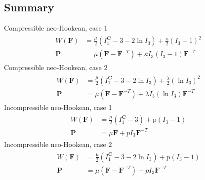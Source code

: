 \documentclass[12pt,3p]{article}
\numberwithin{equation}{section}
\begin{document}
\subsection{Summary}
Compressible neo-Hookean, case 1
\begin{align}
\begin{split}
W(\mathbf{F}) &= \frac{\mu}{2} (I_1^{\mathbf{C}} - 3 - 2 \ln I_3) + \frac{\kappa}{2} (I_3 - 1)^2 \\
\mathbf{P} &= \mu ( \mathbf{F} - \mathbf{F}^{-T}) + \kappa I_3 (I_3 - 1) \mathbf{F}^{-T} 
\end{split}
\end{align}
Compressible neo-Hookean, case 2
\begin{align}
\begin{split}
W(\mathbf{F}) &= \frac{\mu}{2} (I_1^{\mathbf{C}} - 3 - 2 \ln I_3) + \frac{\lambda}{2} (\ln I_3)^2 \\
\mathbf{P} &= \mu ( \mathbf{F} - \mathbf{F}^{-T}) + \lambda I_3 (\ln I_3) \mathbf{F}^{-T} 
\end{split}
\end{align}
Incompressible neo-Hookean, case 1
\begin{align}
\begin{split}
W(\mathbf{F}) &= \frac{\mu}{2} (I_1^{\mathbf{C}}  - 3)  + \text{p} (I_3-1) \\
\mathbf{P} &= \mu \mathbf{F} + p I_3 \mathbf{F}^{-T} 
\end{split}
\end{align}
Incompressible neo-Hookean, case 2 
\begin{align}
\begin{split}
W(\mathbf{F}) &= \frac{\mu}{2} (I_1^{\mathbf{C}}  - 3 - 2 \ln I_3 )  + \text{p} (I_3-1) \\
\mathbf{P} &= \mu ( \mathbf{F} - \mathbf{F}^{-T}) + p I_3 \mathbf{F}^{-T} 
\end{split}
\end{align}
\end{document}
